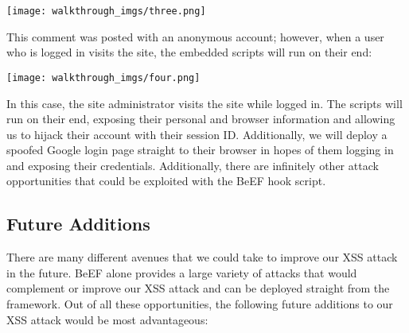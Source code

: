 \documentclass{article}
\begin{document}
    \begin{center}
        \texttt{[image: walkthrough\_imgs/three.png]}
    \end{center}

    This comment was posted with an anonymous account; however, when a user who is logged in visits the site, the embedded scripts will run on their end:

    \begin{center}
        \texttt{[image: walkthrough\_imgs/four.png]}
    \end{center}

    In this case, the site administrator visits the site while logged in. The scripts will run on their end, exposing their personal and browser information and allowing us to hijack their account with their session ID. Additionally, we will deploy a spoofed Google login page straight to their browser in hopes of them logging in and exposing their credentials. Additionally, there are infinitely other attack opportunities that could be exploited with the BeEF hook script.

    \subsection*{Future Additions}

    There are many different avenues that we could take to improve our XSS attack in the future. BeEF alone provides a large variety of attacks that would complement or improve our XSS attack and can be deployed straight from the framework. Out of all these opportunities, the following future additions to our XSS attack would be most advantageous:
\end{document}
